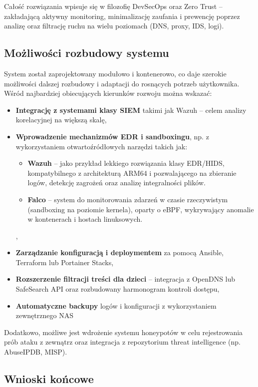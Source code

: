 \documentclass[
    left=2.5cm,         %
    right=2.5cm,        %
    top=2.5cm,          %
    bottom=3cm,         %
    bindingoffset=6mm,  %
    nohyphenation=true %
]{eiti/eiti-thesis} %
\begin{document}
Całość rozwiązania wpisuje się w filozofię DevSecOps oraz Zero Trust – zakładającą aktywny monitoring, minimalizację zaufania i prewencję poprzez analizę oraz filtrację ruchu na wielu poziomach (DNS, proxy, IDS, logi).

\subsection{Możliwości rozbudowy systemu}

System został zaprojektowany modułowo i kontenerowo, co daje szerokie możliwości dalszej rozbudowy i adaptacji do rosnących potrzeb użytkownika. Wśród najbardziej obiecujących kierunków rozwoju można wskazać:
\begin{itemize}
    \item \textbf{Integrację z systemami klasy SIEM} takimi jak Wazuh\cite{wazuh_docs} – celem analizy korelacyjnej na większą skalę,
    \item \textbf{Wprowadzenie mechanizmów EDR i sandboxingu}, np. z wykorzystaniem otwartoźródłowych narzędzi takich jak:
\begin{itemize}
  \item \textbf{Wazuh} – jako przykład lekkiego rozwiązania klasy EDR/HIDS, kompatybilnego z architekturą ARM64 i pozwalającego na zbieranie logów, detekcję zagrożeń oraz analizę integralności plików\cite{wazuh_agent}.
  \item \textbf{Falco} – system do monitorowania zdarzeń w czasie rzeczywistym (sandboxing na poziomie kernela), oparty o eBPF, wykrywający anomalie w kontenerach i hostach linuksowych\cite{falco_docs}.
\end{itemize},
    \item \textbf{Zarządzanie konfiguracją i deploymentem} za pomocą Ansible, Terraform lub Portainer Stacks,
    \item \textbf{Rozszerzenie filtracji treści dla dzieci} – integracja z OpenDNS lub SafeSearch API oraz rozbudowany harmonogram kontroli dostępu,
    \item \textbf{Automatyczne backupy} logów i konfiguracji z wykorzystaniem zewnętrznego NAS
\end{itemize}

Dodatkowo, możliwe jest wdrożenie systemu honeypotów\cite{honeypot_wiki} w celu rejestrowania prób ataku z zewnątrz oraz integracja z repozytorium threat intelligence (np. AbuseIPDB, MISP).

\subsection{Wnioski końcowe}
\end{document}

